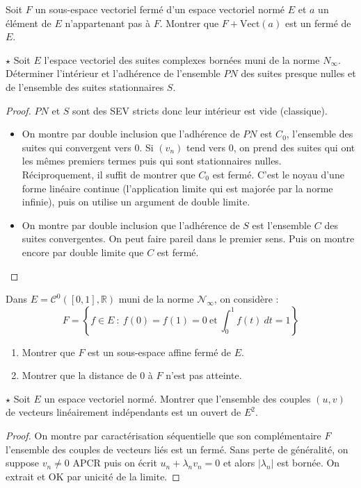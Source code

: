 \documentclass[french,a4paper]{article}
\newcommand{\R}{\mathbb{R}}
\theoremstyle{plain}
\theoremstyle{definition}
\theoremstyle{remark}
\begin{document}
\begin{ex}{}
	Soit $F$ un sous-espace vectoriel fermé d'un espace vectoriel normé $E$ et $a$ un élément de $E$ n'appartenant pas à $F$. Montrer que $F+\text{Vect}(a)$ est un fermé de $E$.
\end{ex}

\begin{ex}{$\star$}
	Soit $E$ l'espace vectoriel des suites complexes bornées muni de la norme $N_\infty$. Déterminer l'intérieur et l'adhérence de l'ensemble $PN$ des suites presque nulles et de l'ensemble des suites stationnaires $S$.
\end{ex}
\begin{proof}
	$PN$ et $S$ sont des SEV stricts donc leur intérieur est vide (classique).
	\begin{itemize}
		\item On montre par double inclusion que l'adhérence de $PN$ est $C_0$, l'ensemble des suites qui convergent vers $0$. Si $(v_n)$ tend vers $0$, on prend des suites qui ont les mêmes premiers termes puis qui sont stationnaires nulles. Réciproquement, il suffit de montrer que $C_0$ est fermé. C'est le noyau d'une forme linéaire continue (l'application limite qui est majorée par la norme infinie), puis on utilise un argument de double limite.
		\item On montre par double inclusion que l'adhérence de $S$ est l'ensemble $C$ des suites convergentes. On peut faire pareil dans le premier sens. Puis on montre encore par double limite que $C$ est fermé.
	\end{itemize}
\end{proof}

\begin{ex}{}
	Dans $E=\mathcal{C}^0([0,1],\R)$ muni de la norme $\mathcal{N}_\infty$, on considère : $$F=\left\{f\in E\ : \ f(0)=f(1)=0\ \text{et}\ \int_{0}^{1}f(t)\ dt=1\right\}$$
	\begin{enumerate}
		\item Montrer que $F$ est un sous-espace affine fermé de $E$.
		\item Montrer que la distance de $0$ à $F$ n'est pas atteinte.
	\end{enumerate}
\end{ex}

\begin{ex}{$\star$}
	Soit $E$ un espace vectoriel normé. Montrer que l'ensemble des couples $(u,v)$ de vecteurs linéairement indépendants est un ouvert de $E^2$.
\end{ex}
\begin{proof}
	On montre par caractérisation séquentielle que son complémentaire $F$ l'ensemble des couples de vecteurs liés est un fermé. Sans perte de généralité, on suppose $v_n\ne 0$ APCR puis on écrit $u_n+\lambda_nv_n=0$ et alors $\lvert\lambda_n\rvert$ est bornée. On extrait et OK par unicité de la limite.
\end{proof}
\end{document}
